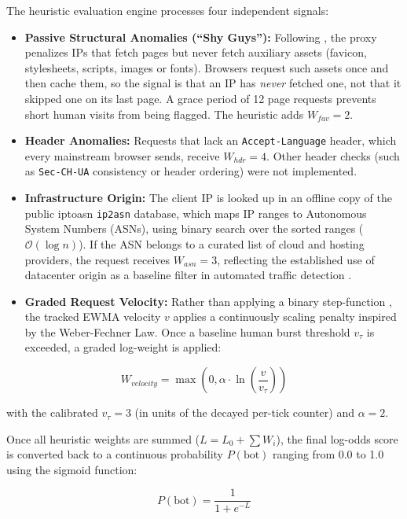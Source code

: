 The heuristic evaluation engine processes four independent signals:
\begin{itemize}
    \item \textbf{Passive Structural Anomalies (``Shy Guys''):} Following , the proxy penalizes IPs that fetch pages but never fetch auxiliary assets (favicon, stylesheets, scripts, images or fonts). Browsers request such assets once and then cache them, so the signal is that an IP has \emph{never} fetched one, not that it skipped one on its last page. A grace period of 12 page requests prevents short human visits from being flagged. The heuristic adds $W_{fav} = 2$.
    \item \textbf{Header Anomalies:} Requests that lack an \texttt{Accept-Language} header, which every mainstream browser sends, receive $W_{hdr} = 4$. Other header checks (such as \texttt{Sec-CH-UA} consistency or header ordering) were not implemented.
    \item \textbf{Infrastructure Origin:} The client IP is looked up in an offline copy of the public iptoasn \texttt{ip2asn} database, which maps IP ranges to Autonomous System Numbers (ASNs), using binary search over the sorted ranges ($\mathcal{O}(\log n)$). If the ASN belongs to a curated list of cloud and hosting providers, the request receives $W_{asn} = 3$, reflecting the established use of datacenter origin as a baseline filter in automated traffic detection \cite{martinez_llamas_balancing_2025}.
    \item \textbf{Graded Request Velocity:} Rather than applying a binary step-function \cite{duskin_distinguishing_2009}, the tracked EWMA velocity $v$ applies a continuously scaling penalty inspired by the Weber-Fechner Law. Once a baseline human burst threshold $v_{\tau}$ is exceeded, a graded log-weight is applied:
\end{itemize}

\begin{equation}
W_{velocity} = \max\left(0, \alpha \cdot \ln\left(\frac{v}{v_{\tau}}\right)\right)
\end{equation}

with the calibrated $v_{\tau} = 3$ (in units of the decayed per-tick counter) and $\alpha = 2$.

Once all heuristic weights are summed ($L = L_0 + \sum W_i$), the final log-odds score is converted back to a continuous probability $P(\text{bot})$ ranging from 0.0 to 1.0 using the sigmoid function:

\begin{equation}
P(\text{bot}) = \frac{1}{1 + e^{-L}}
\end{equation}

